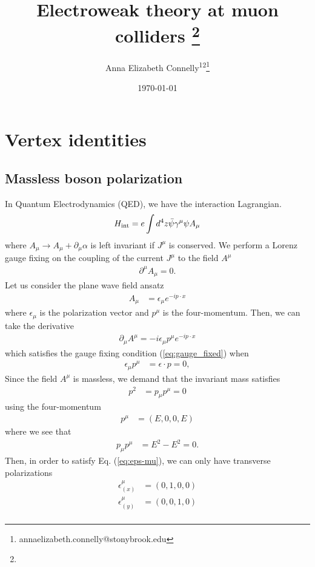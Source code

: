 \documentclass[12pt]{article}
\title{Electroweak theory at muon colliders \thanks{}}
\author{Anna Elizabeth Connelly\textsuperscript{1}\textsuperscript{2}\thanks{annaelizabeth.connelly@stonybrook.edu} }
\date{\today}
\numberwithin{figure}{section}
\numberwithin{table}{section}
\newcommand{\p}[1]{\left(#1\right)}
\begin{document}
\newpage

\section{Vertex identities}

\subsection{Massless boson polarization}
In Quantum Electrodynamics (QED), we have the interaction Lagrangian.
\begin{align*}
    H_{\text{int}}= e\int d^4z\Bar{\psi}\gamma^\mu\psi A_\mu
\end{align*}
where $A_\mu\rightarrow A_\mu+\partial_\mu\alpha$ is left invariant if $J^\mu$ is conserved. We perform a Lorenz gauge fixing on the coupling of the current $J^\mu$ to the field $A^\mu$
\begin{align}
\label{eq:gauge_fixed}
    \partial ^\mu A_\mu = 0.
\end{align}
Let us consider the plane wave field ansatz
\begin{align*}
    A_\mu &= \epsilon_\mu e^{-ip\cdot x}
\end{align*}
where $\epsilon_\mu$ is the polarization vector and $p^\mu$ is the four-momentum.
Then, we can take the derivative
\begin{align*}
    \partial_\mu A^\mu = -i\epsilon_\mu p^\mu e^{-ip\cdot x}
\end{align*}
which satisfies the gauge fixing condition (\ref{eq:gauge_fixed}) when
\begin{align}
\label{eq:eps-mu}
    \epsilon_\mu p^\mu&=\epsilon\cdot p = 0,
\end{align}
Since the field $A^\mu$ is massless, we demand that the invariant mass satisfies
\begin{align*}
    p^2&=p_\mu p^\mu=0
\end{align*}
using the four-momentum
\begin{align*}
    p^\mu &= \p{E,0,0,E}
\end{align*}
where we see that
\begin{align*}
    p_\mu p^\mu &= E^2-E^2 = 0.
\end{align*}
Then, in order to satisfy Eq. (\ref{eq:eps-mu}), we can only have transverse polarizations
\begin{align*}
    \epsilon ^\mu_{(x)}&=(0,1,0,0)\\
        \epsilon ^\mu_{(y)}&=(0,0,1,0)\\
\end{align*}
\end{document}
